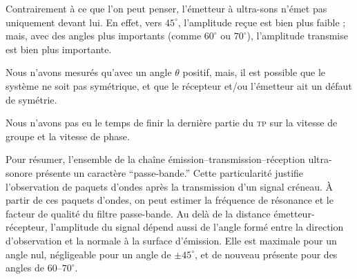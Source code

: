 \documentclass[a4paper,twocolumn,10pt]{report}
\begin{document}
	Contrairement à ce que l'on peut penser, l'émetteur à ultra-sons n'émet pas uniquement devant lui. En effet, vers $45^\circ$, l'amplitude reçue est bien plus faible ; mais, avec des angles plus importants (comme $60^\circ$\/ ou $70^\circ$), l'amplitude transmise est bien plus importante.

	Nous n'avons mesurés qu'avec un angle $\theta$\/ positif, mais, il est possible que le système ne soit pas symétrique, et que le récepteur et/ou l'émetteur ait un défaut de symétrie.

	Nous n'avons pas eu le temps de finir la dernière partie du \textsc{tp} sur la vitesse de groupe et la vitesse de phase.

	\centerline{}

	Pour résumer, l'ensemble de la chaîne émission--transmission--réception ultra-sonore présente un caractère ``passe-bande.'' Cette particularité justifie l'observation de paquets d'ondes après la transmission d'un signal créneau. À partir de ces paquets d'ondes, on peut estimer la fréquence de résonance et le facteur de qualité du filtre passe-bande.
Au delà de la distance émetteur-récepteur, l'amplitude du signal dépend aussi de l'angle formé entre la direction d'observation et la normale à la surface d'émission. Elle est maximale pour un angle nul, négligeable pour un angle de $\pm 45^\circ$, et de nouveau présente pour des angles de $60$--$70^\circ$.

	\sign

	~

	\vspace{15cm}

	~
\end{document}
